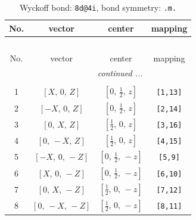 \documentclass[fleqn,8pt]{jsarticle}
\begin{document}
\begin{longtable}{cccc}
\caption{Wyckoff bond: {\tt 8d@4i}, bond symmetry: {\tt .m.}}
 \\
 \hline \hline
No. & vector & center & mapping \\ \hline \endfirsthead

\multicolumn{3}{l}{\tablename\ \thetable{}} \\
 \hline \hline
No. & vector & center & mapping \\ \hline \endhead

 \hline \hline
\multicolumn{3}{r}{\footnotesize\it continued ...} \\ \endfoot

 \hline \hline
\multicolumn{3}{r}{} \\ \endlastfoot

1 & $\left[ X,\, 0,\, Z \right]$ & $\left[ 0,\, \frac{1}{2},\, z \right]$ & {\tt [1,13]} \\ \hline
2 & $\left[ - X,\, 0,\, Z \right]$ & $\left[ 0,\, \frac{1}{2},\, z \right]$ & {\tt [2,14]} \\ \hline
3 & $\left[ 0,\, X,\, Z \right]$ & $\left[ \frac{1}{2},\, 0,\, z \right]$ & {\tt [3,16]} \\ \hline
4 & $\left[ 0,\, - X,\, Z \right]$ & $\left[ \frac{1}{2},\, 0,\, z \right]$ & {\tt [4,15]} \\ \hline
5 & $\left[ - X,\, 0,\, - Z \right]$ & $\left[ 0,\, \frac{1}{2},\, - z \right]$ & {\tt [5,9]} \\ \hline
6 & $\left[ X,\, 0,\, - Z \right]$ & $\left[ 0,\, \frac{1}{2},\, - z \right]$ & {\tt [6,10]} \\ \hline
7 & $\left[ 0,\, X,\, - Z \right]$ & $\left[ \frac{1}{2},\, 0,\, - z \right]$ & {\tt [7,12]} \\ \hline
8 & $\left[ 0,\, - X,\, - Z \right]$ & $\left[ \frac{1}{2},\, 0,\, - z \right]$ & {\tt [8,11]} \\
\end{longtable}
\renewcommand{\arraystretch}{1.2}
\end{document}
